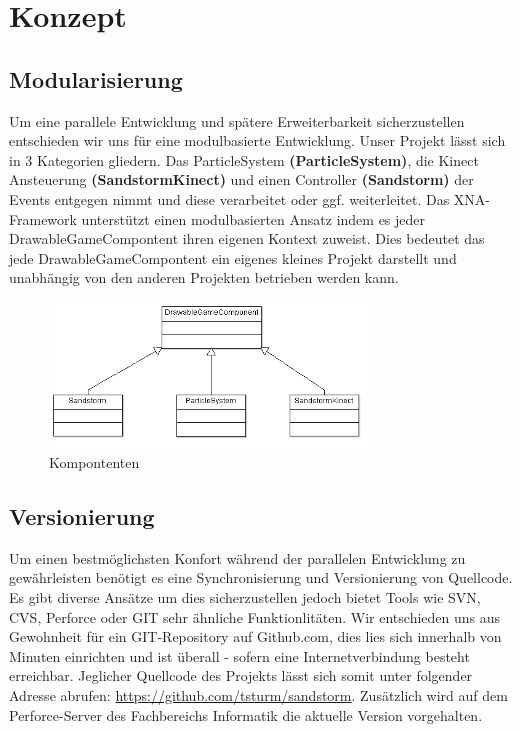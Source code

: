 \chapter{Konzept}
\begin{Spacing}{\mylinespace}

\section{Modularisierung}
Um eine parallele Entwicklung und spätere Erweiterbarkeit sicherzustellen entschieden wir uns für eine modulbasierte Entwicklung.
Unser Projekt lässt sich in 3 Kategorien gliedern. Das ParticleSystem \textbf{(ParticleSystem)}, die Kinect Ansteuerung \textbf{(SandstormKinect)} und einen Controller \textbf{(Sandstorm)} der Events entgegen nimmt und diese verarbeitet oder ggf. weiterleitet.
Das XNA-Framework unterstützt einen modulbasierten Ansatz indem es jeder DrawableGameCompontent ihren eigenen Kontext zuweist.
Dies bedeutet das jede DrawableGameCompontent ein eigenes kleines Projekt darstellt und unabhängig von den anderen Projekten betrieben werden kann.
\begin{figure}[h!]
	\centering
	\vspace*{20px}
	\includegraphics[width=320px]{graphics/DrawableGame.png}
	\caption{Kompontenten}
	\label{fig:singleColor}
\end{figure}

\section{Versionierung}
Um einen bestmöglichsten Konfort während der parallelen Entwicklung zu gewährleisten benötigt es eine Synchronisierung und Versionierung von Quellcode. Es gibt diverse Ansätze um dies sicherzustellen jedoch bietet Tools wie SVN, CVS, Perforce oder GIT sehr ähnliche Funktionlitäten. Wir entschieden uns aus Gewohnheit für ein GIT-Repository auf Github.com, dies lies sich innerhalb von Minuten einrichten und ist überall - sofern eine Internetverbindung besteht erreichbar. Jeglicher Quellcode des Projekts lässt sich somit unter folgender Adresse abrufen: \url{https://github.com/tsturm/sandstorm}. Zusätzlich wird auf dem Perforce-Server des Fachbereichs Informatik die aktuelle Version vorgehalten.



\end{Spacing}
